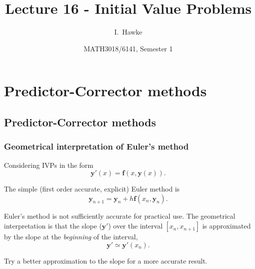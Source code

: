 \documentclass{beamer}
\title[Lecture 16] %
{Lecture 16 - Initial Value Problems}
\author[I. Hawke] %
{I.~Hawke}
\institute[University of Southampton] %
{
  School of Mathematics, \\
  University of Southampton, UK
}
\date[Semester 1] %
{MATH3018/6141, Semester 1}
\newcommand{\by}{{\boldsymbol{y}}}
\newcommand{\bfm}[1]{{\boldsymbol{#1}}}
\begin{document}
\begin{frame}
  \titlepage
\end{frame}

\section{Predictor-Corrector methods}

\subsection{Predictor-Corrector methods}

\begin{frame}
  \frametitle{Geometrical interpretation of Euler's method}

  Considering IVPs in the form
  \begin{equation*}
    \by'(x) = \bfm{f}(x, \by(x)).
  \end{equation*}

  The simple (first order accurate, explicit) Euler method is
  \begin{equation*}
    \by_{n+1} = \by_n + h \bfm{f}(x_n, \by_n).
  \end{equation*} \pause

  Euler's method is not sufficiently accurate for practical use. The
  geometrical interpretation is that the slope ($\by'$) over the
  interval $[x_n, x_{n+1}]$ is approximated by the slope at the
  \emph{beginning} of the interval,
  \begin{equation*}
    \by' \simeq \by'(x_n).
  \end{equation*} \pause

  Try a better approximation to the slope for a more accurate result.

\end{frame}
\end{document}
